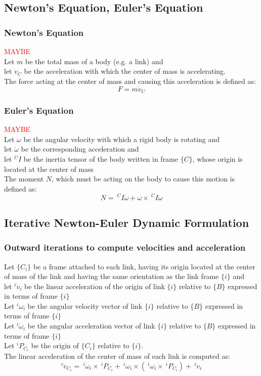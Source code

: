 \documentclass[10pt,a4paper]{article}
\newcommand{\maybe}{\textcolor{red}{MAYBE \\}}
\begin{document}
\subsection{Newton's Equation, Euler's Equation}
\subsubsection{Newton's Equation} \maybe
Let $m$ be the total mass of a body (e.g. a link) and \\
let $\dot v_C$ be the acceleration with which the center of mass is accelerating. \\
The force acting at the center of mass and causing this acceleration is defined as:
$$
F = m\dot v_C
$$


\subsubsection{Euler's Equation} \maybe
Let $\omega$ be the angular velocity with which a rigid body is rotating and \\
let $\dot \omega$ be the corresponding acceleration and \\
let $^CI$ be the inertia tensor of the body written in frame $\{C\}$, whose origin is located at the center of mass \\
The moment $N$, which must be acting on the body to cause this motion is defined as:
$$
N = ~^CI\dot \omega + \omega \times ~^CI \omega
$$

\subsection{Iterative Newton-Euler Dynamic Formulation}
\subsubsection{Outward iterations to compute velocities and acceleration}
Let $\{C_i\}$ be a frame attached to each link, having its origin located at the center of mass of the link and having the same orientation as the link frame $\{i\}$ and \\
let $^i\dot v_i$ be the linear acceleration of the origin of link $\{i\}$ relative to $\{B\}$ expressed in terms of frame $\{i\}$ \\
Let $^i\omega_i$ be the angular velocity vector of link $\{i\}$ relative to $\{B\}$ expressed in terms of frame $\{i\}$ \\
Let $^i\dot \omega_i$ be the angular acceleration vector of link $\{i\}$ relative to $\{B\}$ expressed in terms of frame $\{i\}$ \\
Let $^iP_{C_i}$ be the origin of $\{C_i\}$ relative to $\{i\}$. \\
The linear acceleration of the center of mass of each link is computed as:
$$
^i\dot v_{C_i} = ~^i \dot \omega_i \times ~^iP_{C_i} + ~^i \omega_i \times (~^i \omega_i \times ~^iP_{C_i}) + ~^i \dot v_i
$$
\end{document}

